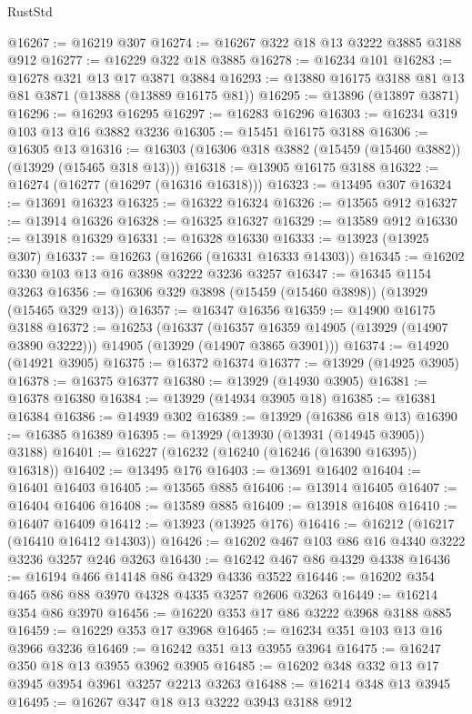 \begin{lexlean}{RustStd}
\begin{coremodule}
@16267 := @16219 @307
@16274 := @16267 @322 @18 @13 @3222 @3885 @3188 @912
@16277 := @16229 @322 @18 @3885
@16278 := @16234 @101
@16283 := @16278 @321 @13 @17 @3871 @3884
@16293 := @13880 @16175 @3188 @81 @13 @81 @3871 (@13888 (@13889 @16175 @81))
@16295 := @13896 (@13897 @3871)
@16296 := @16293 @16295
@16297 := @16283 @16296
@16303 := @16234 @319 @103 @13 @16 @3882 @3236
@16305 := @15451 @16175 @3188
@16306 := @16305 @13
@16316 := @16303 (@16306 @318 @3882 (@15459 (@15460 @3882)) (@13929 (@15465 @318 @13)))
@16318 := @13905 @16175 @3188
@16322 := @16274 (@16277 (@16297 (@16316 @16318)))
@16323 := @13495 @307
@16324 := @13691 @16323
@16325 := @16322 @16324
@16326 := @13565 @912
@16327 := @13914 @16326
@16328 := @16325 @16327
@16329 := @13589 @912
@16330 := @13918 @16329
@16331 := @16328 @16330
@16333 := @13923 (@13925 @307)
@16337 := @16263 (@16266 (@16331 @16333 @14303))
@16345 := @16202 @330 @103 @13 @16 @3898 @3222 @3236 @3257
@16347 := @16345 @1154 @3263
@16356 := @16306 @329 @3898 (@15459 (@15460 @3898)) (@13929 (@15465 @329 @13))
@16357 := @16347 @16356
@16359 := @14900 @16175 @3188
@16372 := @16253
    (@16337
      (@16357 @16359 @14905 (@13929 (@14907 @3890 @3222)))
      @14905
      (@13929 (@14907 @3865 @3901)))
@16374 := @14920 (@14921 @3905)
@16375 := @16372 @16374
@16377 := @13929 (@14925 @3905)
@16378 := @16375 @16377
@16380 := @13929 (@14930 @3905)
@16381 := @16378 @16380
@16384 := @13929 (@14934 @3905 @18)
@16385 := @16381 @16384
@16386 := @14939 @302
@16389 := @13929 (@16386 @18 @13)
@16390 := @16385 @16389
@16395 := @13929 (@13930 (@13931 (@14945 @3905)) @3188)
@16401 := @16227 (@16232 (@16240 (@16246 (@16390 @16395)) @16318))
@16402 := @13495 @176
@16403 := @13691 @16402
@16404 := @16401 @16403
@16405 := @13565 @885
@16406 := @13914 @16405
@16407 := @16404 @16406
@16408 := @13589 @885
@16409 := @13918 @16408
@16410 := @16407 @16409
@16412 := @13923 (@13925 @176)
@16416 := @16212 (@16217 (@16410 @16412 @14303))
@16426 := @16202 @467 @103 @86 @16 @4340 @3222 @3236 @3257 @246 @3263
@16430 := @16242 @467 @86 @4329 @4338
@16436 := @16194 @466 @14148 @86 @4329 @4336 @3522
@16446 := @16202 @354 @465 @86 @88 @3970 @4328 @4335 @3257 @2606 @3263
@16449 := @16214 @354 @86 @3970
@16456 := @16220 @353 @17 @86 @3222 @3968 @3188 @885
@16459 := @16229 @353 @17 @3968
@16465 := @16234 @351 @103 @13 @16 @3966 @3236
@16469 := @16242 @351 @13 @3955 @3964
@16475 := @16247 @350 @18 @13 @3955 @3962 @3905
@16485 := @16202 @348 @332 @13 @17 @3945 @3954 @3961 @3257 @2213 @3263
@16488 := @16214 @348 @13 @3945
@16495 := @16267 @347 @18 @13 @3222 @3943 @3188 @912

\end{coremodule}
\end{lexlean}
